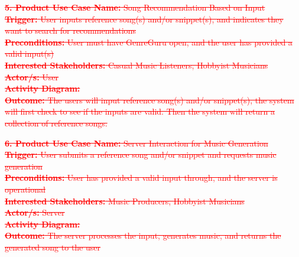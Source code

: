 \documentclass[12pt]{article}
\begin{document}
\textcolor{red}{\sout{\noindent \textbf{5. Product Use Case Name:} Song Recommendation Based on Input}} \\
\textcolor{red}{\sout{\textbf{Trigger:} User inputs reference song(s) and/or snippet(s), and indicates they want to search for recommendations}} \\
\textcolor{red}{\sout{\textbf{Preconditions:} User must have GenreGuru open, and the user has provided a valid input(s)}} \\
\textcolor{red}{\sout{\textbf{Interested Stakeholders:} Casual Music Listeners, Hobbyist Musicians}} \\
\textcolor{red}{\sout{\textbf{Actor/s:} User}} \\
\textcolor{red}{\sout{\textbf{Activity Diagram:}}} \\
\textcolor{red}{\sout{\textbf{Outcome:} The users will input reference song(s) and/or snippet(s), the system will first check to see if the inputs are valid. Then the system will return a collection of reference songs.}}

\vspace{1cm}

\textcolor{red}{\sout{\textbf{6. Product Use Case Name:} Server Interaction for Music Generation}} \\
\textcolor{red}{\sout{\textbf{Trigger:} User submits a reference song and/or snippet and requests music generation}} \\
\textcolor{red}{\sout{\textbf{Preconditions:} User has provided a valid input through, and the server is operational}} \\
\textcolor{red}{\sout{\textbf{Interested Stakeholders:} Music Producers, Hobbyist Musicians }}\\
\textcolor{red}{\sout{\textbf{Actor/s:} Server}} \\
\textcolor{red}{\sout{\textbf{Activity Diagram:}}} \\
\textcolor{red}{\sout{\textbf{Outcome:} The server processes the input, generates music, and returns the generated song to the user}}

\vspace{1cm}
\end{document}
